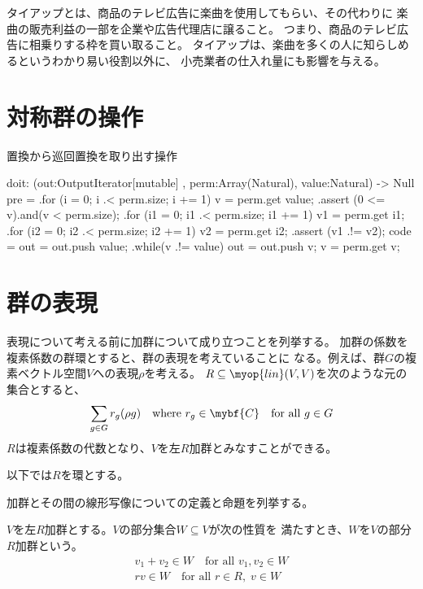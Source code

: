 	タイアップとは、商品のテレビ広告に楽曲を使用してもらい、その代わりに
	楽曲の販売利益の一部を企業や広告代理店に譲ること。
	つまり、商品のテレビ広告に相乗りする枠を買い取ること。
	タイアップは、楽曲を多くの人に知らしめるというわかり易い役割以外に、
	小売業者の仕入れ量にも影響を与える。

\section{対称群の操作}\label{s1:対称群の操作} %
	\begin{algorithm}
	\caption{置換から巡回置換を取り出す操作}
	\begin{cprog}
	doit: (out:OutputIterator[mutable]
		, perm:Array(Natural), value:Natural) -> Null {
		pre = {
			.for (i = 0; i .< perm.size; i += 1) {
				v = perm.get value;
				.assert (0 <= v).and(v < perm.size);
			}
			.for (i1 = 0; i1 .< perm.size; i1 += 1) {
				v1 = perm.get i1;
				.for (i2 = 0; i2 .< perm.size; i2 += 1) {
					v2 = perm.get i2;
					.assert (v1 .!= v2);
				}
			}
		}
		code = {
			out = out.push value;
			.while(v .!= value) {
				out = out.push v;
				v = perm.get v;
			}
		}
	}
	\end{cprog}
	\end{algorithm}

\section{群の表現}\label{s1:群の表現} %
	表現について考える前に加群について成り立つことを列挙する。
	加群の係数を複素係数の群環とすると、群の表現を考えていることに
	なる。例えば、群$G$の複素ベクトル空間$V$への表現$\rho$を考える。
	$R\subseteq \myop{lin}(V,V)$を次のような元の集合とすると、
	\begin{equation*}\begin{split} %
		\sum_{g\in G}r_g(\rho g)\quad\text{where }r_g\in \mybf{C}
		\quad\text{for all }g\in G
	\end{split}\end{equation*} %
	$R$は複素係数の代数となり、$V$を左$R$加群とみなすことができる。

	以下では$R$を環とする。

	加群とその間の線形写像についての定義と命題を列挙する。

	\begin{definition}[部分加群]\label{def:部分加群} %
		$V$を左$R$加群とする。$V$の部分集合$W\subseteq V$が次の性質を
		満たすとき、$W$を$V$の部分$R$加群という。
		\begin{equation*}\begin{split} %
			v_1+v_2\in W \quad\text{for all }v_1,v_2\in W \\
			rv\in W \quad\text{for all }r\in R,\;v\in W \\
		\end{split}\end{equation*} %
	\end{definition} %

